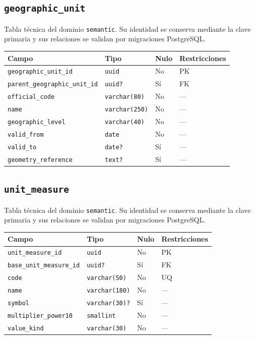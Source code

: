 \documentclass[11pt]{article}
\begin{document}
\subsection{\texttt{geographic\_unit}}
Tabla técnica del dominio \texttt{semantic}. Su identidad se conserva mediante la clave primaria y sus relaciones se validan por migraciones PostgreSQL.
\begin{longtable}{>{\raggedright\arraybackslash}p{} p{} p{} p{}}
\toprule Campo & Tipo & Nulo & Restricciones \\ \midrule\endhead
\texttt{geographic\_unit\_id} & \texttt{uuid} & No & PK \\
\texttt{parent\_geographic\_unit\_id} & \texttt{uuid?} & Sí & FK \\
\texttt{official\_code} & \texttt{varchar(80)} & No & --- \\
\texttt{name} & \texttt{varchar(250)} & No & --- \\
\texttt{geographic\_level} & \texttt{varchar(40)} & No & --- \\
\texttt{valid\_from} & \texttt{date} & No & --- \\
\texttt{valid\_to} & \texttt{date?} & Sí & --- \\
\texttt{geometry\_reference} & \texttt{text?} & Sí & --- \\
\bottomrule\end{longtable}
\subsection{\texttt{unit\_measure}}
Tabla técnica del dominio \texttt{semantic}. Su identidad se conserva mediante la clave primaria y sus relaciones se validan por migraciones PostgreSQL.
\begin{longtable}{>{\raggedright\arraybackslash}p{} p{} p{} p{}}
\toprule Campo & Tipo & Nulo & Restricciones \\ \midrule\endhead
\texttt{unit\_measure\_id} & \texttt{uuid} & No & PK \\
\texttt{base\_unit\_measure\_id} & \texttt{uuid?} & Sí & FK \\
\texttt{code} & \texttt{varchar(50)} & No & UQ \\
\texttt{name} & \texttt{varchar(180)} & No & --- \\
\texttt{symbol} & \texttt{varchar(30)?} & Sí & --- \\
\texttt{multiplier\_power10} & \texttt{smallint} & No & --- \\
\texttt{value\_kind} & \texttt{varchar(30)} & No & --- \\
\bottomrule\end{longtable}
\end{document}
